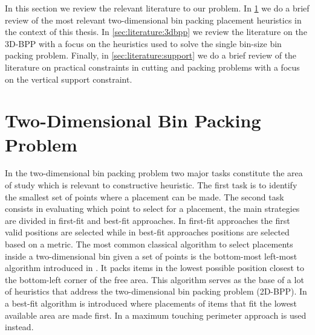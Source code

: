 In this section we review the relevant literature to our problem. 
In \cref{sec:literature:2dbpp} we do a brief review of the most relevant two-dimensional bin packing placement heuristics in the context of this thesis.
In \cref{sec:literature:3dbpp} we review the literature on the 3D-BPP with a focus on the heuristics used to solve the single bin-size bin packing problem.
Finally, in \cref{sec:literature:support} we do a brief review of the literature on practical constraints in cutting and packing problems with a focus on the vertical support constraint.

\section{Two-Dimensional Bin Packing Problem}
\label{sec:literature:2dbpp}%
In the two-dimensional bin packing problem two major tasks constitute the area of study which is relevant to constructive heuristic. 
The first task is to identify the smallest set of points where a placement can be made.
The second task consists in evaluating which point to select for a placement, the main strategies are divided in first-fit and best-fit approaches.
In first-fit approaches the first valid positions are selected while in best-fit approaches positions are selected based on a metric.
The most common classical algorithm to select placements inside a two-dimensional bin given a set of points is the bottom-most left-most algorithm introduced in \cite{Baker1980}. 
It packs items in the lowest possible position closest to the bottom-left corner of the free area. 
This algorithm serves as the base of a lot of heuristics that address the two-dimensional bin packing problem (2D-BPP).
In \cite{burke2004new} a best-fit algorithm is introduced where placements of items that fit the lowest available area are made first.
In \cite{lodi1999heuristic} a maximum touching perimeter approach is used instead.

